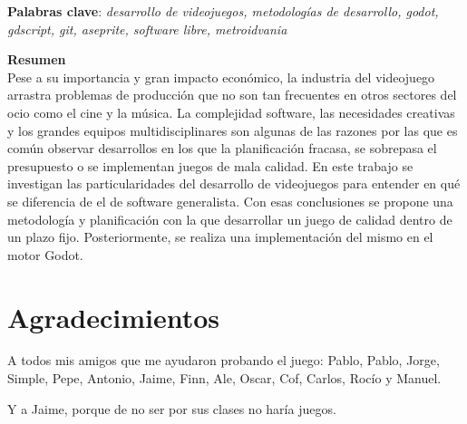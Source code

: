 \thispagestyle{empty}


\vspace{0.5cm}
\noindent\textbf{Palabras clave}: \textit{desarrollo de videojuegos, metodologías de desarrollo, godot, gdscript, git, aseprite, software libre, metroidvania}
\vspace{0.7cm}

\noindent\textbf{Resumen}\\

Pese a su importancia y gran impacto económico, la industria del videojuego arrastra problemas de producción que no son tan frecuentes en otros sectores del ocio como el cine y la música. La complejidad software, las necesidades creativas y los grandes equipos multidisciplinares son algunas de las razones por las que es común observar desarrollos en los que la planificación fracasa, se sobrepasa el presupuesto o se implementan juegos de mala calidad. En este trabajo se investigan las particularidades del desarrollo de videojuegos para entender en qué se diferencia de el de software generalista. Con esas conclusiones se propone una metodología y planificación con la que desarrollar un juego de calidad dentro de un plazo fijo. Posteriormente, se realiza una implementación del mismo en el motor Godot.


\cleardoublepage

\thispagestyle{empty}

\chapter*{Agradecimientos}

A todos mis amigos que me ayudaron probando el juego: Pablo, Pablo, Jorge, Simple, Pepe, Antonio, Jaime, Finn, Ale, Oscar, Cof, Carlos, Rocío y Manuel.

Y a Jaime, porque de no ser por sus clases no haría juegos.


